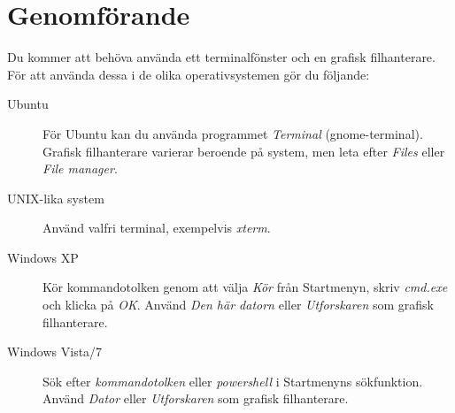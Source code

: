 \documentclass[11pt,a4paper]{miunasgn}
\begin{document}
\section{Genomförande}
\label{sec:Genomforande}
\noindent
Du kommer att behöva använda ett terminalfönster och en grafisk filhanterare.
För att använda dessa i de olika operativsystemen gör du följande:
\begin{description}
	\item[Ubuntu] För Ubuntu kan du använda programmet \emph{Terminal} 
		(gnome-terminal).
		Grafisk filhanterare varierar beroende på system, men leta efter 
		\emph{Files} eller \emph{File manager}.
	\item[UNIX-lika system] Använd valfri terminal, exempelvis \emph{xterm}.
	\item[Windows XP] Kör kommandotolken genom att välja \emph{Kör} från
		Startmenyn, skriv \emph{cmd.exe} och klicka på \emph{OK}.
		Använd \emph{Den här datorn} eller \emph{Utforskaren} som grafisk
		filhanterare.
	\item[Windows Vista/7] Sök efter \emph{kommandotolken} eller
		\emph{powershell} i Startmenyns sökfunktion.
		Använd \emph{Dator} eller \emph{Utforskaren} som grafisk filhanterare.
\end{description}
\end{document}
